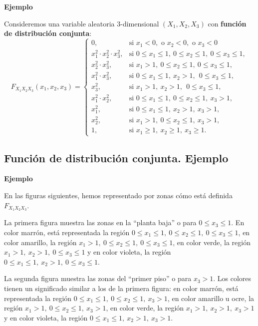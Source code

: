 \documentclass[]{book}
\begin{document}
\textbf{Ejemplo}

Consideremos una variable aleatoria \(3\)-dimensional \((X_1,X_2,X_3)\) con \textbf{función de distribución conjunta}:
\[
F_{X_1X_2X_3}(x_1,x_2,x_3)=\begin{cases}
0, & \mbox{si }x_1<0,\mbox{ o }x_2<0,\mbox{ o }x_3 <0\\
x_1^2\cdot x_2^2\cdot x_3^2, & \mbox{si }0\leq x_1\leq 1,\ 0\leq x_2\leq 1,\ 0\leq x_3\leq 1, \\
 x_2^2\cdot x_3^2, & \mbox{si }x_1> 1,\ 0\leq x_2\leq  1,\ 0\leq x_3\leq  1, \\
 x_1^2\cdot x_3^2, & \mbox{si }0\leq x_1\leq  1,\ x_2> 1,\ \ 0\leq x_3\leq  1, \\
 x_3^2, & \mbox{si }x_1> 1,\ x_2> 1,\ \ 0\leq x_3\leq  1, \\
 x_1^2\cdot x_2^2, & \mbox{si }0\leq x_1\leq  1,\ 0\leq x_2\leq  1,\ x_3> 1,\\
 x_1^2, & \mbox{si }0\leq x_1\leq  1,\ x_2 >  1,\ x_3> 1,\\
 x_2^2, & \mbox{si }x_1>1,\ 0\leq x_2\leq  1,\ x_3> 1,\\
1, & \mbox{si }x_1\geq 1,\ x_2\geq 1,\ x_3\geq 1.
\end{cases}
\]

\hypertarget{funciuxf3n-de-distribuciuxf3n-conjunta.-ejemplo-7}{%
\subsection{Función de distribución conjunta. Ejemplo}\label{funciuxf3n-de-distribuciuxf3n-conjunta.-ejemplo-7}}

\textbf{Ejemplo}

En las figuras siguientes, hemos representado por zonas cómo está definida \(F_{X_1X_2X_3}\).

La primera figura muestra las zonas en la ``planta baja'' o para \(0\leq x_3\leq 1\).
En color marrón, está representada la región \(0\leq x_1\leq 1,\ 0\leq x_2\leq 1,\ 0\leq x_3\leq 1\), en color amarillo, la región \(x_1> 1,\ 0\leq x_2\leq 1,\ 0\leq x_3\leq 1\), en color verde, la región \(x_1>1,\ x_2>1,\ 0\leq x_3\leq 1\) y en color violeta, la región \(0\leq x_1\leq 1,\ x_2>1,\ 0\leq x_3\leq 1\).

La segunda figura muestra las zonas del ``primer piso'' o para \(x_3>1\). Los colores tienen un significado similar a los de la primera figura: en color marrón, está representada la región \(0\leq x_1\leq 1,\ 0\leq x_2\leq 1,\  x_3> 1\), en color amarillo u ocre, la región \(x_1> 1,\ 0\leq x_2\leq 1,\ x_3> 1\), en color verde, la región \(x_1>1,\ x_2>1,\ x_3> 1\) y en color violeta, la región \(0\leq x_1\leq 1,\ x_2>1,\ x_3> 1\).
\end{document}
